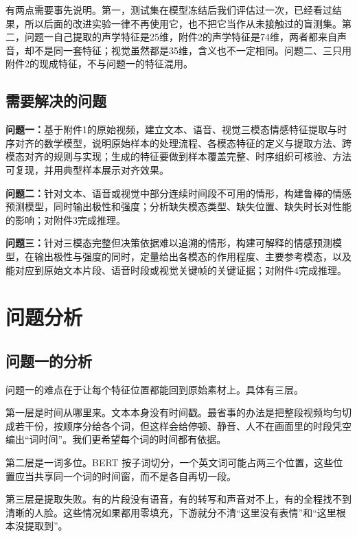 有两点需要事先说明。第一，测试集在模型冻结后我们评估过一次，已经看过结果，所以后面的改进实验一律不再使用它，也不把它当作从未接触过的盲测集。第二，问题一自己提取的声学特征是25维，附件2的声学特征是74维，两者都来自声音，却不是同一套特征；视觉虽然都是35维，含义也不一定相同。问题二、三只用附件2的现成特征，不与问题一的特征混用。

\subsection{需要解决的问题}

\textbf{问题一：}基于附件1的原始视频，建立文本、语音、视觉三模态情感特征提取与时序对齐的数学模型，说明原始样本的处理流程、各模态特征的定义与提取方法、跨模态对齐的规则与实现；生成的特征要做到样本覆盖完整、时序组织可核验、方法可复现，并用典型样本展示对齐效果。

\textbf{问题二：}针对文本、语音或视觉中部分连续时间段不可用的情形，构建鲁棒的情感预测模型，同时输出极性和强度；分析缺失模态类型、缺失位置、缺失时长对性能的影响；对附件3完成推理。

\textbf{问题三：}针对三模态完整但决策依据难以追溯的情形，构建可解释的情感预测模型，在输出极性与强度的同时，定量给出各模态的作用程度、主要参考模态，以及能对应到原始文本片段、语音时段或视觉关键帧的关键证据；对附件4完成推理。

\section{问题分析}

\subsection{问题一的分析}

问题一的难点在于让每个特征位置都能回到原始素材上。具体有三层。

第一层是时间从哪里来。文本本身没有时间戳。最省事的办法是把整段视频均匀切成若干份，按顺序分给各个词，但这样会给停顿、静音、人不在画面里的时段凭空编出“词时间”。我们更希望每个词的时间都有依据。

第二层是一词多位。BERT 按子词切分，一个英文词可能占两三个位置，这些位置应当共享同一个词的时间窗，而不是各自再切一段。

第三层是提取失败。有的片段没有语音，有的转写和声音对不上，有的全程找不到清晰的人脸。这些情况如果都用零填充，下游就分不清“这里没有表情”和“这里根本没提取到”。


